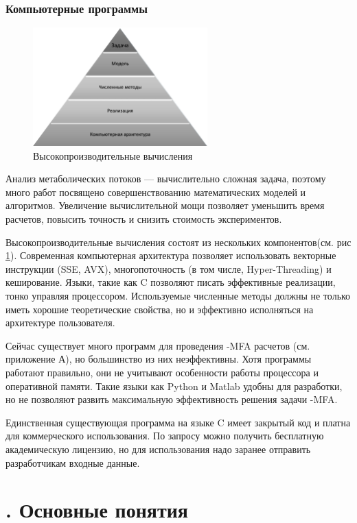 \documentclass[14pt, a4paper]{extreport}
\newcommand{\CC}{C\nolinebreak\hspace{-.05em}\raisebox{.4ex}{\tiny\bf +}\nolinebreak\hspace{-.10em}\raisebox{.4ex}{\tiny\bf +}}
\def\CC{{C\nolinebreak[4]\hspace{-.05em}\raisebox{.4ex}{\tiny\bf ++}}} %
\begin{document}
\clearpage
\subsection{Компьютерные программы}
\begin{figure}[b]
	\centering
	\includegraphics[width=0.60\textwidth]{hpc.png}
	\caption{Высокопроизводительные вычисления}
	\label{hpc}
\end{figure}
Анализ метаболических потоков --- вычислительно сложная задача, поэтому много работ посвящено совершенствованию математических моделей и алгоритмов. Увеличение вычислительной мощи позволяет уменьшить время расчетов, повысить точность и снизить стоимость экспериментов.

Высокопроизводительные вычисления состоят из нескольких компонентов(см. рис \ref{hpc}). Современная компьютерная архитектура позволяет использовать векторные инструкции (SSE, AVX), многопоточность (в том числе, Hyper-Threading) и кеширование. Языки, такие как \CC{} позволяют писать эффективные реализации, тонко управляя процессором. Используемые численные методы должны не только иметь хорошие теоретические свойства, но и эффективно исполняться на архитектуре пользователя.

Сейчас существует много программ для проведения -MFA расчетов (см. приложение А), но большинство из них неэффективны. Хотя программы работают правильно, они не учитывают особенности работы процессора и оперативной памяти. Такие языки как Python и Matlab удобны для разработки, но не позволяют развить максимальную эффективность решения задачи -MFA.

Единственная существующая программа на языке \CC{} имеет закрытый код и платна для коммерческого использования. По запросу можно получить бесплатную академическую лицензию, но для использования надо заранее отправить разработчикам входные данные.

\chapter[Основные понятия]{\thechapter{}. Основные понятия}
\end{document}
